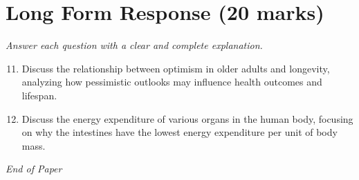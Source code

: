 \documentclass[12pt]{article}
\begin{document}
\section*{Long Form Response (20 marks)}
\textit{Answer each question with a clear and complete explanation.}
\begin{enumerate}[label=\arabic*.]
\setcounter{enumi}{10}
\item Discuss the relationship between optimism in older adults and longevity, analyzing how
pessimistic outlooks may influence health outcomes and lifespan.
\item Discuss the energy expenditure of various organs in the human body, focusing on why the
intestines have the lowest energy expenditure per unit of body mass.
\end{enumerate}

\vfill
\noindent\textit{End of Paper}
\end{document}
